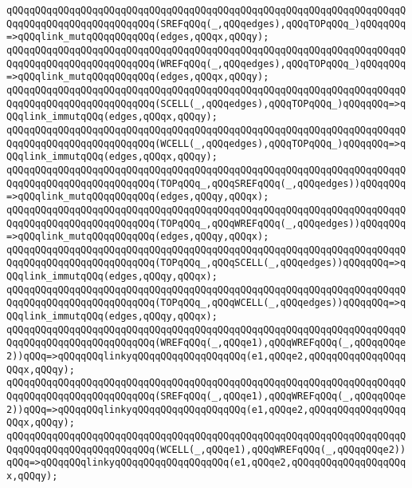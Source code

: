 \verb|qQQqqQQqqQQqqQQqqQQqqQQqqQQqqQQqqQQqqQQqqQQqqQQqqQQqqQQqqQQqqQQqqQQqqQQqqQQqqQQqqQQqqQQqqQQqqQQq(SREFqQQq(_,qQQqedges),qQQqTOPqQQq_)qQQqqQQq=>qQQqlink_mutqQQqqQQqqQQq(edges,qQQqx,qQQqy);|\newline
\verb|qQQqqQQqqQQqqQQqqQQqqQQqqQQqqQQqqQQqqQQqqQQqqQQqqQQqqQQqqQQqqQQqqQQqqQQqqQQqqQQqqQQqqQQqqQQqqQQq(WREFqQQq(_,qQQqedges),qQQqTOPqQQq_)qQQqqQQq=>qQQqlink_mutqQQqqQQqqQQq(edges,qQQqx,qQQqy);|\newline
\verb|qQQqqQQqqQQqqQQqqQQqqQQqqQQqqQQqqQQqqQQqqQQqqQQqqQQqqQQqqQQqqQQqqQQqqQQqqQQqqQQqqQQqqQQqqQQqqQQq(SCELL(_,qQQqedges),qQQqTOPqQQq_)qQQqqQQq=>qQQqlink_immutqQQq(edges,qQQqx,qQQqy);|\newline
\verb|qQQqqQQqqQQqqQQqqQQqqQQqqQQqqQQqqQQqqQQqqQQqqQQqqQQqqQQqqQQqqQQqqQQqqQQqqQQqqQQqqQQqqQQqqQQqqQQq(WCELL(_,qQQqedges),qQQqTOPqQQq_)qQQqqQQq=>qQQqlink_immutqQQq(edges,qQQqx,qQQqy);|\newline
\newline
\verb|qQQqqQQqqQQqqQQqqQQqqQQqqQQqqQQqqQQqqQQqqQQqqQQqqQQqqQQqqQQqqQQqqQQqqQQqqQQqqQQqqQQqqQQqqQQqqQQq(TOPqQQq_,qQQqSREFqQQq(_,qQQqedges))qQQqqQQq=>qQQqlink_mutqQQqqQQqqQQq(edges,qQQqy,qQQqx);|\newline
\verb|qQQqqQQqqQQqqQQqqQQqqQQqqQQqqQQqqQQqqQQqqQQqqQQqqQQqqQQqqQQqqQQqqQQqqQQqqQQqqQQqqQQqqQQqqQQqqQQq(TOPqQQq_,qQQqWREFqQQq(_,qQQqedges))qQQqqQQq=>qQQqlink_mutqQQqqQQqqQQq(edges,qQQqy,qQQqx);|\newline
\verb|qQQqqQQqqQQqqQQqqQQqqQQqqQQqqQQqqQQqqQQqqQQqqQQqqQQqqQQqqQQqqQQqqQQqqQQqqQQqqQQqqQQqqQQqqQQqqQQq(TOPqQQq_,qQQqSCELL(_,qQQqedges))qQQqqQQq=>qQQqlink_immutqQQq(edges,qQQqy,qQQqx);|\newline
\verb|qQQqqQQqqQQqqQQqqQQqqQQqqQQqqQQqqQQqqQQqqQQqqQQqqQQqqQQqqQQqqQQqqQQqqQQqqQQqqQQqqQQqqQQqqQQqqQQq(TOPqQQq_,qQQqWCELL(_,qQQqedges))qQQqqQQq=>qQQqlink_immutqQQq(edges,qQQqy,qQQqx);|\newline
\newline
\verb|qQQqqQQqqQQqqQQqqQQqqQQqqQQqqQQqqQQqqQQqqQQqqQQqqQQqqQQqqQQqqQQqqQQqqQQqqQQqqQQqqQQqqQQqqQQqqQQq(WREFqQQq(_,qQQqe1),qQQqWREFqQQq(_,qQQqqQQqe2))qQQq=>qQQqqQQqlinkyqQQqqQQqqQQqqQQqqQQq(e1,qQQqe2,qQQqqQQqqQQqqQQqqQQqx,qQQqy);|\newline
\verb|qQQqqQQqqQQqqQQqqQQqqQQqqQQqqQQqqQQqqQQqqQQqqQQqqQQqqQQqqQQqqQQqqQQqqQQqqQQqqQQqqQQqqQQqqQQqqQQq(SREFqQQq(_,qQQqe1),qQQqWREFqQQq(_,qQQqqQQqe2))qQQq=>qQQqqQQqlinkyqQQqqQQqqQQqqQQqqQQq(e1,qQQqe2,qQQqqQQqqQQqqQQqqQQqx,qQQqy);|\newline
\verb|qQQqqQQqqQQqqQQqqQQqqQQqqQQqqQQqqQQqqQQqqQQqqQQqqQQqqQQqqQQqqQQqqQQqqQQqqQQqqQQqqQQqqQQqqQQqqQQq(WCELL(_,qQQqe1),qQQqWREFqQQq(_,qQQqqQQqe2))qQQq=>qQQqqQQqlinkyqQQqqQQqqQQqqQQqqQQq(e1,qQQqe2,qQQqqQQqqQQqqQQqqQQqx,qQQqy);|\newline
